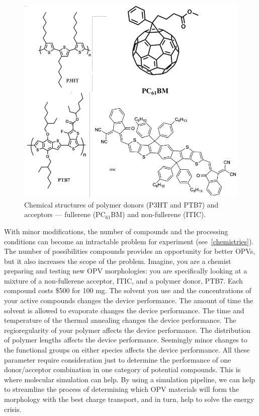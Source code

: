\begin{figure}
    \centering
    \includegraphics[width=\linewidth]{images/chem_structures.pdf}
    \caption{Chemical structures of polymer donors (P3HT and PTB7) and acceptors --- fullerene (PC$_{61}$BM) and non-fullerene (ITIC).}\label{chemistries}
\end{figure}
\noindent With minor modifications, the number of compounds and the processing conditions can become an intractable problem for experiment (see~\autoref{chemistries}).
The number of possibilities compounds provides an opportunity for better OPVs, but it also increases the scope of the problem.
Imagine, you are a chemist preparing and testing new OPV morphologies: you are specifically looking at a mixture of a non-fullerene acceptor, ITIC, and a polymer donor, PTB7. 
Each compound costs \$500 for 100 mg\cite{sigmaaldrich}.
The solvent you use and the concentrations of your active compounds changes the device performance\cite{Hoppe2004a}.
The amount of time the solvent is allowed to evaporate changes the device performance\cite{Li2007}.
The time and temperature of the thermal annealing changes the device performance\cite{Ma2005}.
The regioregularity of your polymer affects the device performance\cite{Kim2006}.
The distribution of polymer lengths affects the device performance\cite{Zhao2013b}.
Seemingly minor changes to the functional groups on either species affects the device performance\cite{Swick2019a}.
All these parameter require consideration just to determine the performance of one donor/acceptor combination in one category of potential compounds\cite{Dou2013}.
This is where molecular simulation can help.
By using a simulation pipeline, we can help to streamline the process of determining which OPV materials will form the morphology with the best charge transport, and in turn, help to solve the energy crisis.

